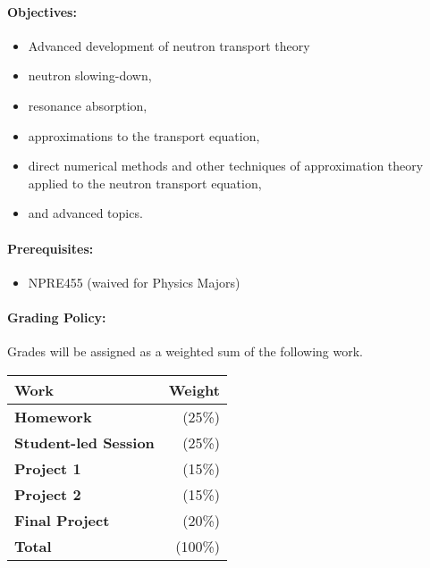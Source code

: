 \documentclass[11pt, a4paper]{article}
\begin{document}

\renewcommand{\refname}{\normalfont\selectfont\normalsize}\vspace{-1cm}


\paragraph{Objectives:}
\begin{itemize}
\item Advanced development of neutron transport theory
\item  neutron slowing-down,
\item resonance absorption,
\item  approximations to the transport equation,
\item  direct numerical methods and other techniques of approximation theory 
        applied to the neutron transport equation,
\item  and advanced topics. 
\end{itemize}

\paragraph{Prerequisites:}
\begin{itemize}
\item NPRE455 (waived for Physics Majors) 
\end{itemize}

\paragraph{Grading Policy:} Grades will be assigned as a weighted sum of the
following work.

\begin{table}[h]
\begin{tabularx}{\textwidth}{Xr}
        \textbf{Work} & \textbf{Weight} \\
\hline
\textbf{Homework}               & (25\%)  \\
\textbf{Student-led Session}    & (25\%)  \\
\textbf{Project 1}              & (15\%)  \\
\textbf{Project 2}              & (15\%)  \\
\textbf{Final Project}          & (20\%)  \\
\hline
\textbf{Total}                  & (100\%)\\
\end{tabularx}
\end{table}
\end{document}
